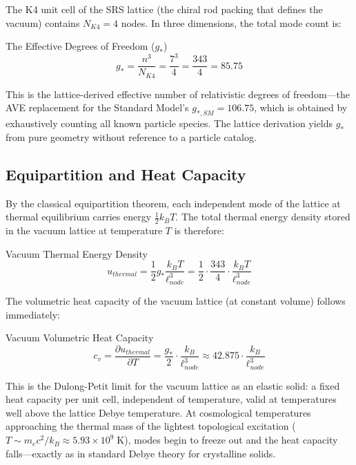 The K4 unit cell of the SRS lattice (the chiral rod packing that defines the vacuum) contains $N_{K4} = 4$ nodes. In three dimensions, the total mode count is:
\begin{resultbox}{The Effective Degrees of Freedom ($g_*$)}
\begin{equation}
    g_* = \frac{n^3}{N_{K4}} = \frac{7^3}{4} = \frac{343}{4} = 85.75
    \label{eq:g_star}
\end{equation}
\end{resultbox}

This is the lattice-derived effective number of relativistic degrees of freedom---the AVE replacement for the Standard Model's $g_{*,SM} = 106.75$, which is obtained by exhaustively counting all known particle species. The lattice derivation yields $g_*$ from pure geometry without reference to a particle catalog.

\subsection{Equipartition and Heat Capacity}

By the classical equipartition theorem, each independent mode of the lattice at thermal equilibrium carries energy $\frac{1}{2} k_B T$. The total thermal energy density stored in the vacuum lattice at temperature $T$ is therefore:
\begin{resultbox}{Vacuum Thermal Energy Density}
\begin{equation}
    u_{thermal} = \frac{1}{2} g_* \frac{k_B T}{\ell_{node}^3} = \frac{1}{2} \cdot \frac{343}{4} \cdot \frac{k_B T}{\ell_{node}^3}
    \label{eq:thermal_energy_density}
\end{equation}
\end{resultbox}

The volumetric heat capacity of the vacuum lattice (at constant volume) follows immediately:
\begin{resultbox}{Vacuum Volumetric Heat Capacity}
\begin{equation}
    c_v = \frac{\partial u_{thermal}}{\partial T} = \frac{g_*}{2} \cdot \frac{k_B}{\ell_{node}^3} \approx 42.875 \cdot \frac{k_B}{\ell_{node}^3}
    \label{eq:heat_capacity}
\end{equation}
\end{resultbox}

This is the Dulong-Petit limit for the vacuum lattice as an elastic solid: a fixed heat capacity per unit cell, independent of temperature, valid at temperatures well above the lattice Debye temperature. At cosmological temperatures approaching the thermal mass of the lightest topological excitation ($T \sim m_e c^2 / k_B \approx 5.93 \times 10^9 \;\text{K}$), modes begin to freeze out and the heat capacity falls---exactly as in standard Debye theory for crystalline solids.


